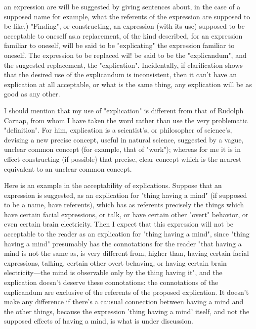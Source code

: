\documentclass[10pt,twoside,draft]{memoir}
\begin{document}
an expression are will be suggested by giving sentences about, in the case of a 
supposed name for example, what the referents of the expression are 
supposed to be like.) "Finding", or constructing, an expression (with its use) 
supposed to be acceptable to oneself as.a replacement, of the kind described, 
for an expression familiar to oneself, will be said to be "explicating" the 
expression familiar to oneself. The expression to be replaced wil! be said to 
be the "explicandum", and the suggested replacement, the "explication". 
Incidentally, if clarification shows that the desired use of the explicandum is 
inconsistent, then it can't have an explication at all acceptable, or what is the 
same thing, any explication will be as good as any other. 

I should mention that my use of "explication" is different from that of 
Rudolph Carnap, from whom I have taken the word rather than use the very 
problematic "definition". For him, explication is a scientist's, or philosopher 
of science's, devising a new precise concept, useful in natural science, 
suggested by a vague, unclear common concept (for example, that of 
"work"); whereas for me it is in effect constructing (if possible) that precise, 
clear concept which is the nearest equivalent to an unclear common concept. 

Here is an example in the acceptability of explications. Suppose that an 
expression is suggested, as an explication for "thing having a mind" (if 
supposed to be a name, have referents), which has as referents precisely the 
things which have certain facial expressions, or talk, or have certain other 
"overt" behavior, or even certain brain electricity. Then I expect that this 
expression will not be acceptable to the reader as an explication for "thing 
having a mind", since "thing having a mind" presumably has the connotations 
for the reader "that having a mind is not the same as, is very different from, 
higher than, having certain facial expressions, talking, certain other overt 
behaving, or having certain brain electricity---the mind is observable only by 
the thing having it", and the explication doesn't deserve these connotations: 
the connotations of the explicandum are exclusive of the referents of the 
proposed explication. It doesn't make any difference if there's a causual 
connection between having a mind and the other things, because the 
expression 'thing having a mind' itself, and not the supposed effects of 
having a mind, is what is under discussion. 
\end{document}
